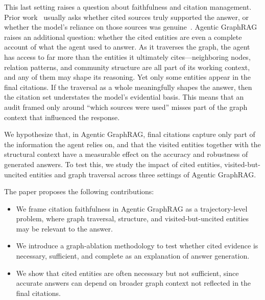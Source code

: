 \documentclass[
]{ceurart}
\begin{document}
This last setting raises a question about faithfulness and citation management. Prior work~\cite{bohnet2023attributedqaeval, gao2023enablinglargelanguagemodels} usually asks whether cited sources truly supported the answer, or whether the model's reliance on those sources was genuine~\cite{wallat2024correctness}. Agentic GraphRAG raises an additional question: whether the cited entities are even a complete account of what the agent used to answer. As it traverses the graph, the agent has access to far more than the entities it ultimately cites---neighboring nodes, relation patterns, and community structure are all part of its working context, and any of them may shape its reasoning. Yet only some entities appear in the final citations. If the traversal as a whole meaningfully shapes the answer, then the citation set understates the model’s evidential basis. This means that an audit framed only around ``which sources were used'' misses part of the graph context that influenced the response.

We hypothesize that, in Agentic GraphRAG, final citations capture only part of the information the agent relies on, and that the visited entities together with the structural context have a measurable effect on the accuracy and robustness of generated answers. To test this, we study the impact of cited entities, visited-but-uncited entities and graph traversal across three settings of Agentic GraphRAG. 

The paper proposes the following contributions:
\begin{itemize}
    \item We frame citation faithfulness in Agentic GraphRAG as a trajectory-level problem, where graph traversal, structure, and visited-but-uncited entities may be relevant to the answer.

    \item We introduce a graph-ablation methodology to test whether cited evidence is necessary, sufficient, and complete as an explanation of answer generation.

    \item We show that cited entities are often necessary but not sufficient, since accurate answers can depend on broader graph context not reflected in the final citations.
\end{itemize}


\end{document}
